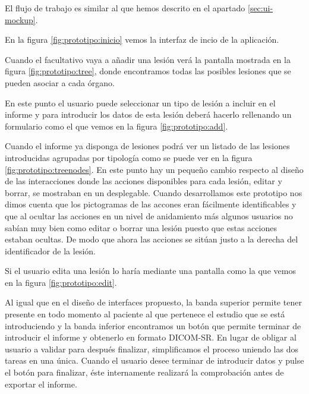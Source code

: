 El flujo de trabajo es similar al que hemos descrito en el apartado \ref{sec:ui-mockup}.\par
En la figura \ref{fig:prototipo:inicio} vemos la interfaz de incio de la aplicación.\par
Cuando el facultativo vaya a añadir una lesión verá la pantalla mostrada en la figura \ref{fig:prototipo:tree}, donde encontramos todas las posibles lesiones que se pueden asociar a cada órgano.\par 
En este punto el usuario puede seleccionar un tipo de lesión a incluir en el informe y para introducir los datos de esta lesión deberá hacerlo rellenando un formulario como el que vemos en la figura \ref{fig:prototipo:add}. \par
Cuando el informe ya disponga de lesiones podrá ver un listado de las lesiones introducidas agrupadas por tipología como se puede ver en la figura \ref{fig:prototipo:treenodes}. En este punto hay un pequeño cambio respecto al diseño de las interacciones donde las acciones disponibles para cada lesión, editar y borrar, se mostraban en un desplegable. Cuando desarrollamos este prototipo nos dimos cuenta que los pictogramas de las accones eran fácilmente identificables y que al ocultar las acciones en un nivel de anidamiento más algunos usuarios no sabían muy bien como editar o borrar una lesión puesto que estas acciones estaban ocultas. De modo que ahora las acciones se sitúan justo a la derecha del identificador de la lesión.\par
Si el usuario edita una lesión lo haría mediante una pantalla como la que vemos en la figura \ref{fig:prototipo:edit}.\par
Al igual que en el diseño de interfaces propuesto, la banda superior permite tener presente en todo momento al paciente al que pertenece el estudio que se está introduciendo y la banda inferior  encontramos un botón que permite terminar de introducir el informe y obtenerlo en formato DICOM-SR. En lugar de obligar al usuario a validar para después finalizar, simplificamos el proceso uniendo las dos tareas en una única. Cuando el usuario desee terminar de introducir datos y pulse el botón para finalizar, éste internamente realizará la comprobación antes de exportar el informe.\medskip \par

